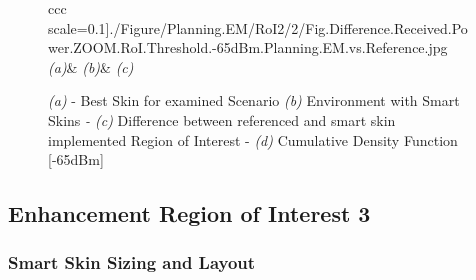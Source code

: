\begin{figure}[H]
\begin{center}
\begin{tabular}{ccc}
  scale=0.1]{./Figure/Planning.EM/RoI2/2/Fig.Difference.Received.Power.ZOOM.RoI.Threshold.-65dBm.Planning.EM.vs.Reference.jpg}\tabularnewline
\emph{(a)}&
\emph{(b)}&
\emph{(c)}\tabularnewline
{}\tabularnewline
{}\tabularnewline
{}\tabularnewline
\end{tabular}\end{center}


\caption{\footnotesize \emph{(a)} - Best Skin for examined Scenario \emph{(b)} Environment with Smart Skins \emph{- (c)} Difference between
referenced and smart skin implemented Region of Interest - \emph{(d)}
Cumulative Density Function {[}-65dBm{]}}
\end{figure}



\subsection{Enhancement Region of Interest 3}


\subsubsection{Smart Skin Sizing and Layout}

